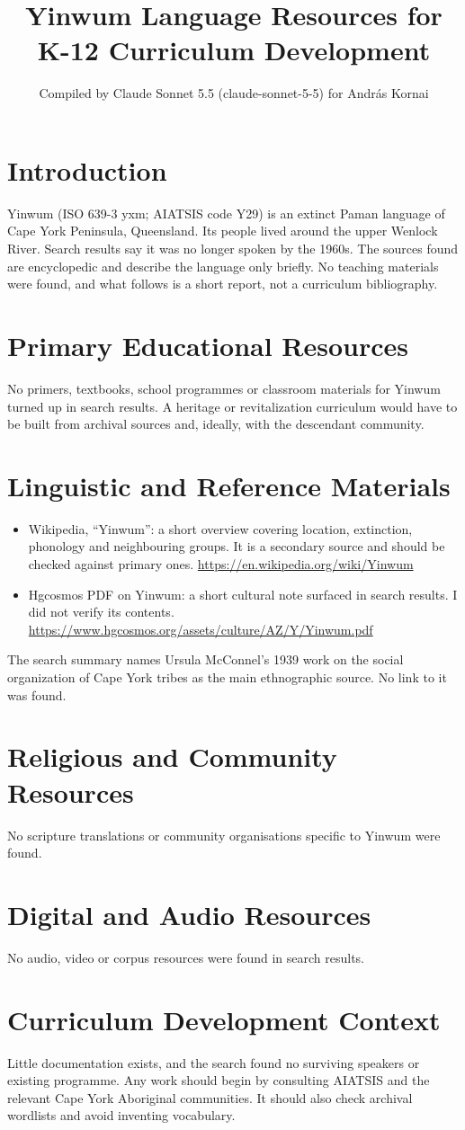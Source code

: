 \documentclass[12pt]{article}
\title{Yinwum Language Resources for K-12 Curriculum Development}
\author{Compiled by Claude Sonnet 5.5 (claude-sonnet-5-5) for Andr\'as Kornai}
\date{}
\begin{document}
\maketitle

\section{Introduction}
Yinwum (ISO 639-3 yxm; AIATSIS code Y29) is an extinct Paman language of Cape York Peninsula, Queensland. Its people lived around the upper Wenlock River. Search results say it was no longer spoken by the 1960s. The sources found are encyclopedic and describe the language only briefly. No teaching materials were found, and what follows is a short report, not a curriculum bibliography.

\section{Primary Educational Resources}
No primers, textbooks, school programmes or classroom materials for Yinwum turned up in search results. A heritage or revitalization curriculum would have to be built from archival sources and, ideally, with the descendant community.

\section{Linguistic and Reference Materials}
\begin{itemize}
\item Wikipedia, ``Yinwum'': a short overview covering location, extinction, phonology and neighbouring groups. It is a secondary source and should be checked against primary ones. \url{https://en.wikipedia.org/wiki/Yinwum}
\item Hgcosmos PDF on Yinwum: a short cultural note surfaced in search results. I did not verify its contents. \url{https://www.hgcosmos.org/assets/culture/AZ/Y/Yinwum.pdf}
\end{itemize}
The search summary names Ursula McConnel's 1939 work on the social organization of Cape York tribes as the main ethnographic source. No link to it was found.

\section{Religious and Community Resources}
No scripture translations or community organisations specific to Yinwum were found.

\section{Digital and Audio Resources}
No audio, video or corpus resources were found in search results.

\section{Curriculum Development Context}
Little documentation exists, and the search found no surviving speakers or existing programme. Any work should begin by consulting AIATSIS and the relevant Cape York Aboriginal communities. It should also check archival wordlists and avoid inventing vocabulary.
\end{document}
